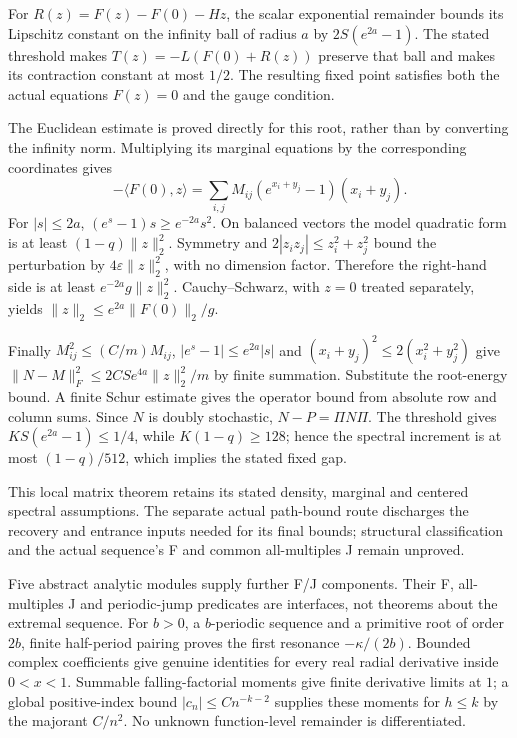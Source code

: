 \documentclass[11pt]{article}
\begin{document}
For $R(z)=F(z)-F(0)-Hz$, the scalar exponential remainder bounds its Lipschitz constant on the infinity ball of radius $a$ by $2S(e^{2a}-1)$. The stated threshold makes $T(z)=-L(F(0)+R(z))$ preserve that ball and makes its contraction constant at most $1/2$. The resulting fixed point satisfies both the actual equations $F(z)=0$ and the gauge condition.

The Euclidean estimate is proved directly for this root, rather than by converting the infinity norm. Multiplying its marginal equations by the corresponding coordinates gives
\[
 -\langle F(0),z\rangle
 =\sum_{i,j}M_{ij}(e^{x_i+y_j}-1)(x_i+y_j).
\]
For $|s|\le2a$, $(e^s-1)s\ge e^{-2a}s^2$. On balanced vectors the model quadratic form is at least $(1-q)\|z\|_2^2$. Symmetry and $2|z_i z_j|\le z_i^2+z_j^2$ bound the perturbation by $4\varepsilon\|z\|_2^2$, with no dimension factor. Therefore the right-hand side is at least $e^{-2a}g\|z\|_2^2$. Cauchy--Schwarz, with $z=0$ treated separately, yields $\|z\|_2\le e^{2a}\|F(0)\|_2/g$.

Finally $M_{ij}^2\le(C/m)M_{ij}$, $|e^s-1|\le e^{2a}|s|$ and $(x_i+y_j)^2\le2(x_i^2+y_j^2)$ give
$\|N-M\|_F^2\le2CS e^{4a}\|z\|_2^2/m$ by finite summation. Substitute the root-energy bound. A finite Schur estimate gives the operator bound from absolute row and column sums. Since $N$ is doubly stochastic, $N-P=\Pi N\Pi$. The threshold gives $KS(e^{2a}-1)\le1/4$, while $K(1-q)\ge128$; hence the spectral increment is at most $(1-q)/512$, which implies the stated fixed gap.

This local matrix theorem retains its stated density, marginal and centered spectral assumptions. The separate actual path-bound route discharges the recovery and entrance inputs needed for its final bounds; structural classification and the actual sequence's F and common all-multiples J remain unproved.

Five abstract analytic modules supply further F/J components. Their F, all-multiples J and periodic-jump predicates are interfaces, not theorems about the extremal sequence. For $b>0$, a $b$-periodic sequence and a primitive root of order $2b$, finite half-period pairing proves the first resonance $-\kappa/(2b)$. Bounded complex coefficients give genuine identities for every real radial derivative inside $0<x<1$. Summable falling-factorial moments give finite derivative limits at $1$; a global positive-index bound $|c_n|\le Cn^{-k-2}$ supplies these moments for $h\le k$ by the majorant $C/n^2$. No unknown function-level remainder is differentiated.
\end{document}
